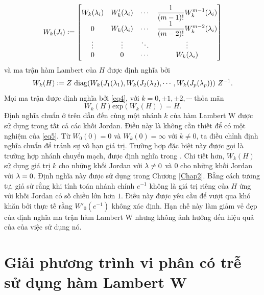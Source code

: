 \begin{equation}\label{eq3}
	W_k(J_i) := \begin{bmatrix}
		W_k(\lambda_i)  & W'_k(\lambda_i) & \cdots & \dfrac{1}{(m-1)!} W_k ^{m-1}(\lambda_i)\\
		0 & W_k(\lambda_i) & \cdots & \dfrac{1}{(m-2)!} W_k ^{m-2}(\lambda_i)\\
		\vdots  & \vdots  & \ddots & \vdots  \\
		0 & 0 & \cdots & W_k(\lambda_i)
	\end{bmatrix} 
\end{equation}
và ma trận hàm Lambert của $H$ được định nghĩa bởi
\begin{equation}\label{eq4}
	W_k(H) := Z \ \mathrm{diag} (W_k(J_1(\lambda_1),W_k(J_2(\lambda_2), \cdots , W_k(J_p(\lambda_p) )) \ Z^{-1}.
\end{equation}
Mọi ma trận được định nghĩa bởi \eqref{eq4}, với $k = 0, \pm 1, \pm 2, \cdots$ thỏa mãn
%
\begin{equation}\label{eq5}
	W_k(H) \mathrm{exp}	(W_k(H)) = H.
\end{equation}
%		
Định nghĩa chuẩn ở trên dẫn đến cùng một nhánh $k$ của hàm Lambert W được sử dụng trong tất cả các khối Jordan. Điều này là không cần thiết để có một nghiệm của \ref{eq5}. Từ $W_0(0)= 0$ và $W_k(0) = \infty$ với $k \ne 0$, ta điều chỉnh định nghĩa chuẩn để tránh sự vô hạn giá trị. Trường hợp đặc biệt này được gọi là trường hợp nhánh chuyển mạch, được định nghĩa trong \cite{Yi10} . Chi tiết hơn, $W_k(H)$ sử dụng giá trị $k$ cho những khối Jordan với $\lambda \ne 0$ và $0$ cho những khối Jordan với $\lambda = 0$. Định nghĩa này được sử dụng trong Chương \ref{Chap2}.
Bằng cách tương tự, giả sử rằng khi tính toán nhánh chính $e ^{-1}$ không là giá trị riêng của $H$ ứng với khối Jordan có số chiều lớn hơn $1$. Điều này được yêu cầu để vượt qua khó khăn bởi thực tế rằng $W'_0(e ^{-1})$ không xác định. Hạn chế này làm giảm vẻ đẹp của định nghĩa ma trận hàm Lambert W nhưng không ảnh hưởng đến hiệu quả của của việc sử dụng nó.



\section{Giải phương trình vi phân có trễ sử dụng hàm Lambert W}
